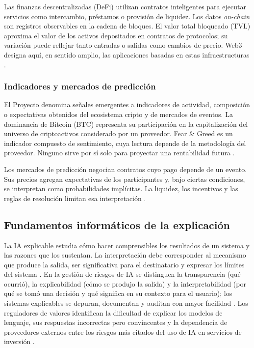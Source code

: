 Las finanzas descentralizadas (DeFi) utilizan contratos inteligentes para ejecutar servicios como intercambio, préstamos o provisión de liquidez. Los datos \textit{on-chain} son registros observables en la cadena de bloques. El valor total bloqueado (TVL) aproxima el valor de los activos depositados en contratos de protocolos; su variación puede reflejar tanto entradas o salidas como cambios de precio. Web3 designa aquí, en sentido amplio, las aplicaciones basadas en estas infraestructuras \parencite{Schar2021}.

\subsubsection{Indicadores y mercados de predicción}\label{subsec:senales-emergentes}\label{subsec:prediction-markets}

El Proyecto denomina señales emergentes a indicadores de actividad, composición o expectativas obtenidos del ecosistema cripto y de mercados de eventos. La dominancia de Bitcoin (BTC) representa su participación en la capitalización del universo de criptoactivos considerado por un proveedor. Fear \& Greed es un indicador compuesto de sentimiento, cuya lectura depende de la metodología del proveedor. Ninguno sirve por sí solo para proyectar una rentabilidad futura \parencite{CoinGeckoGlobal,AlternativeFNG}.

Los mercados de predicción negocian contratos cuyo pago depende de un evento. Sus precios agregan expectativas de los participantes y, bajo ciertas condiciones, se interpretan como probabilidades implícitas. La liquidez, los incentivos y las reglas de resolución limitan esa interpretación \parencite{WolfersZitzewitz2004}.

\subsection{Fundamentos informáticos de la explicación}\label{subsec:ia-explicable}

La IA explicable estudia cómo hacer comprensibles los resultados de un sistema y las razones que los sustentan. La interpretación debe corresponder al mecanismo que produce la salida, ser significativa para el destinatario y expresar los límites del sistema \parencite{Arrieta2020,NIST8312}. En la gestión de riesgos de IA se distinguen la transparencia (qué ocurrió), la explicabilidad (cómo se produjo la salida) y la interpretabilidad (por qué se tomó una decisión y qué significa en su contexto para el usuario); los sistemas explicables se depuran, documentan y auditan con mayor facilidad \parencite{NIST2023airmf}. Los reguladores de valores identifican la dificultad de explicar los modelos de lenguaje, sus respuestas incorrectas pero convincentes y la dependencia de proveedores externos entre los riesgos más citados del uso de IA en servicios de inversión \parencite{IOSCO2025ai}.

